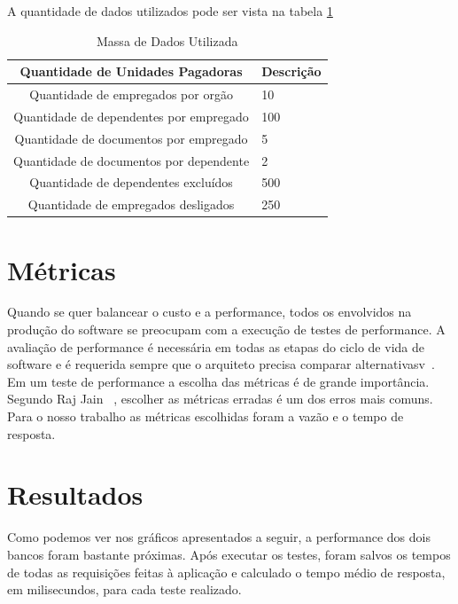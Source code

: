 A quantidade de dados utilizados pode ser vista na tabela \ref{tab:massadadosutil}

\begin{table}
	\caption{Massa de Dados Utilizada}
	\begin{center}
	\begin{tabularx}{\textwidth}{ | c | X | }
	\hline
		\textbf{Quantidade de Unidades Pagadoras} & \multicolumn{1}{c|}{\textbf{Descrição}} \\
	\hline
		Quantidade de empregados por orgão & 10\\
	\hline 
		Quantidade de dependentes por empregado & 100 \\
	\hline
		Quantidade de documentos por empregado & 5\\
	\hline
		Quantidade de documentos por dependente & 2\\
	\hline
	\hline
		Quantidade de dependentes excluídos & 500\\
	\hline
	\hline
		Quantidade de empregados desligados & 250\\
	\hline
	\end {tabularx}
	\end{center}
	\label{tab:massadadosutil}
\end{table}

\section{Métricas}

Quando se quer balancear o custo e a performance, todos os envolvidos na produção do software se preocupam com a execução de testes de performance. A avaliação de performance é necessária em todas as etapas do ciclo de vida de software e é requerida sempre que o arquiteto precisa comparar alternativasv~\cite{rajjain}. Em um teste de performance a escolha das métricas é de grande importância. Segundo Raj Jain ~\cite{rajjain}, escolher as métricas erradas é um dos erros mais comuns. Para o nosso trabalho as métricas escolhidas foram a vazão e o tempo de resposta.

\section{Resultados}

Como podemos ver nos gráficos apresentados a seguir, a performance dos dois bancos foram bastante próximas. Após executar os testes, foram salvos os tempos de todas as requisições feitas à aplicação e calculado o tempo médio de resposta, em milisecundos, para cada teste realizado.


